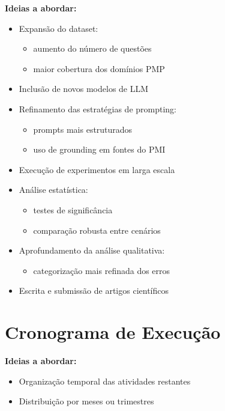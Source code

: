 \textbf{Ideias a abordar:}
\begin{itemize}
    \item Expansão do dataset:
    \begin{itemize}
        \item aumento do número de questões
        \item maior cobertura dos domínios PMP
    \end{itemize}
    \item Inclusão de novos modelos de LLM
    \item Refinamento das estratégias de prompting:
    \begin{itemize}
        \item prompts mais estruturados
        \item uso de grounding em fontes do PMI
    \end{itemize}
    \item Execução de experimentos em larga escala
    \item Análise estatística:
    \begin{itemize}
        \item testes de significância
        \item comparação robusta entre cenários
    \end{itemize}
    \item Aprofundamento da análise qualitativa:
    \begin{itemize}
        \item categorização mais refinada dos erros
    \end{itemize}
    \item Escrita e submissão de artigos científicos
\end{itemize}

\section{Cronograma de Execução}
\label{subsec:cronograma}

\textbf{Ideias a abordar:}
\begin{itemize}
    \item Organização temporal das atividades restantes
    \item Distribuição por meses ou trimestres
\end{itemize}

